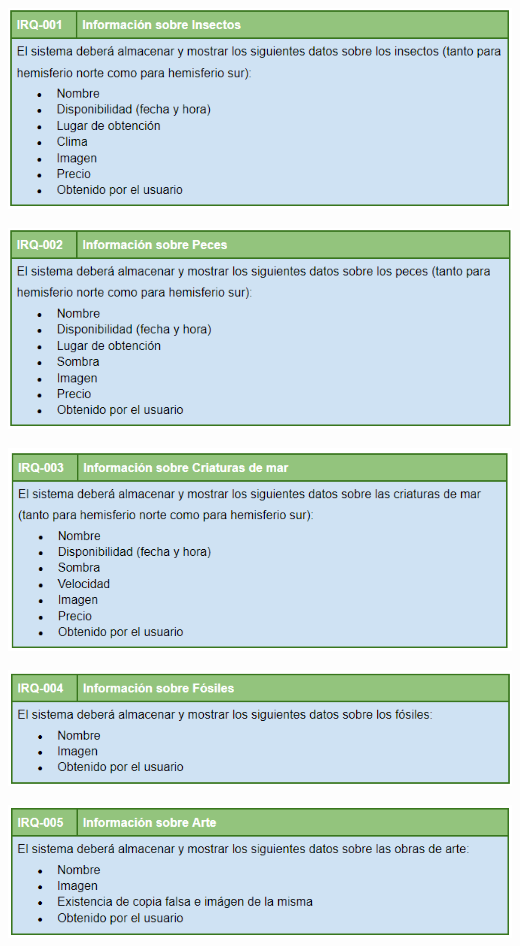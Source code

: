 	\bigskip
	
	\includegraphics[width=\textwidth]{img/cap5/IR/1.png}
	
	\bigskip
	
	\includegraphics[width=\textwidth]{img/cap5/IR/2.png}
	
	\bigskip
	
	\includegraphics[width=\textwidth]{img/cap5/IR/3.png}
	
	\bigskip
	
	\includegraphics[width=\textwidth]{img/cap5/IR/4.png}
	
	\bigskip
	
	\includegraphics[width=\textwidth]{img/cap5/IR/5.png}
	
